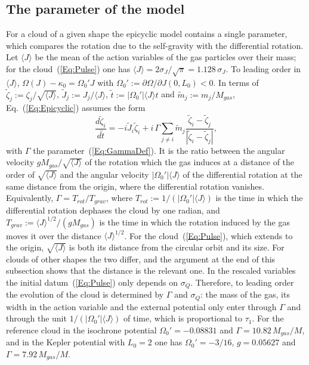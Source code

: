 \subsection{The parameter of the model}
\label{SubSec:EpiParameter}

For a cloud of a given shape the epicyclic model contains a single parameter, which compares the rotation due to the self-gravity with the differential rotation. Let $\langle J\rangle$ be the mean of the action variables of the gas particles over their mass; for the cloud~(\ref{Eq:Pulse}) one has $\langle J\rangle = 2\sigma_J/\sqrt{\pi} = 1.128\,\sigma_J$. To leading order in $\langle J\rangle$, $\Omega(J) - \kappa_0 = \Omega_0' J$ with $\Omega_0' := \partial\Omega/\partial J(0,L_0) < 0$. In terms of $\tilde{\zeta}_j := \zeta_j/\sqrt{\langle J\rangle}$, $\tilde{J}_j := J_j/\langle J\rangle$, $\tilde{t} := |\Omega_0'|\langle J\rangle t$ and $\tilde{m}_j := m_j/M_{gas}$, Eq.~(\ref{Eq:Epicyclic}) assumes the form
\begin{equation}
\frac{d\tilde{\zeta}_i}{d\tilde{t}} = -i\tilde{J}_i\tilde{\zeta}_i
 + i\,\Gamma\sum\limits_{j\neq i} \tilde{m}_j\frac{\tilde{\zeta}_i - \tilde{\zeta}_j}{|\tilde{\zeta}_i - \tilde{\zeta}_j|},
\label{Eq:EpicyclicScaled}
\end{equation}
with $\Gamma$ the parameter~(\ref{Eq:GammaDef}). It is the ratio between the angular velocity $g M_{gas}/\sqrt{\langle J\rangle}$ of the rotation which the gas induces at a distance of the order of $\sqrt{\langle J\rangle}$ and the angular velocity $|\Omega_0'|\langle J\rangle$ of the differential rotation at the same distance from the origin, where the differential rotation vanishes. Equivalently, $\Gamma = T_{rot}/T_{grav}$, where $T_{rot} := 1/(|\Omega_0'|\langle J\rangle)$ is the time in which the differential rotation dephases the cloud by one radian, and $T_{grav} := \langle J\rangle^{1/2}/(g M_{gas})$ is the time in which the rotation induced by the gas moves it over the distance $\langle J\rangle^{1/2}$. For the cloud~(\ref{Eq:Pulse}), which extends to the origin, $\sqrt{\langle J\rangle}$ is both its distance from the circular orbit and its size. For clouds of other shapes the two differ, and the argument at the end of this subsection shows that the distance is the relevant one. In the rescaled variables the initial datum~(\ref{Eq:Pulse}) only depends on $\sigma_Q$. Therefore, to leading order the evolution of the cloud is determined by $\Gamma$ and $\sigma_Q$: the mass of the gas, its width in the action variable and the external potential only enter through $\Gamma$ and through the unit $1/(|\Omega_0'|\langle J\rangle)$ of time, which is proportional to $\tau_1$. For the reference cloud in the isochrone potential $\Omega_0' = -0.08831$ and $\Gamma = 10.82\, M_{gas}/M$, and in the Kepler potential with $L_0 = 2$ one has $\Omega_0' = -3/16$, $g = 0.05627$ and $\Gamma = 7.92\, M_{gas}/M$.

